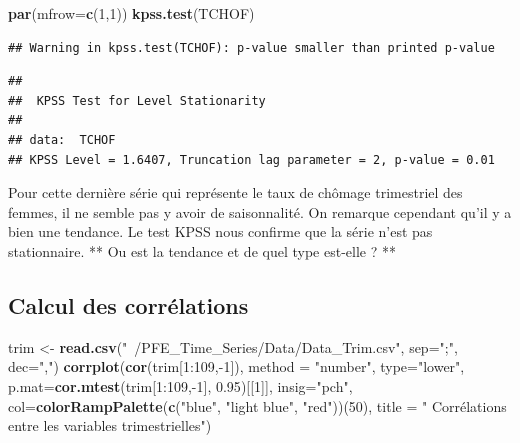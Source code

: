 \documentclass[11pt,]{article}
\newenvironment{Shaded}{\begin{snugshade}}{\end{snugshade}}
\newcommand{\KeywordTok}[1]{\textcolor[rgb]{0.13,0.29,0.53}{\textbf{{#1}}}}
\newcommand{\DataTypeTok}[1]{\textcolor[rgb]{0.13,0.29,0.53}{{#1}}}
\newcommand{\DecValTok}[1]{\textcolor[rgb]{0.00,0.00,0.81}{{#1}}}
\newcommand{\FloatTok}[1]{\textcolor[rgb]{0.00,0.00,0.81}{{#1}}}
\newcommand{\StringTok}[1]{\textcolor[rgb]{0.31,0.60,0.02}{{#1}}}
\newcommand{\NormalTok}[1]{{#1}}
\begin{document}
\begin{Shaded}
\begin{Highlighting}[]
  \KeywordTok{par}\NormalTok{(}\DataTypeTok{mfrow=}\KeywordTok{c}\NormalTok{(}\DecValTok{1}\NormalTok{,}\DecValTok{1}\NormalTok{))}
  \KeywordTok{kpss.test}\NormalTok{(TCHOF)}
\end{Highlighting}
\end{Shaded}

\begin{verbatim}
## Warning in kpss.test(TCHOF): p-value smaller than printed p-value
\end{verbatim}

\begin{verbatim}
## 
##  KPSS Test for Level Stationarity
## 
## data:  TCHOF
## KPSS Level = 1.6407, Truncation lag parameter = 2, p-value = 0.01
\end{verbatim}

Pour cette dernière série qui représente le taux de chômage trimestriel
des femmes, il ne semble pas y avoir de saisonnalité. On remarque
cependant qu'il y a bien une tendance. Le test KPSS nous confirme que la
série n'est pas stationnaire. ** Ou est la tendance et de quel type
est-elle ? **

\subsection{Calcul des corrélations}\label{calcul-des-correlations}

\begin{Shaded}
\begin{Highlighting}[]
\NormalTok{trim <-}\StringTok{ }\KeywordTok{read.csv}\NormalTok{(}\StringTok{"~/PFE_Time_Series/Data/Data_Trim.csv"}\NormalTok{, }\DataTypeTok{sep=}\StringTok{";"}\NormalTok{, }\DataTypeTok{dec=}\StringTok{","}\NormalTok{)}
\KeywordTok{corrplot}\NormalTok{(}\KeywordTok{cor}\NormalTok{(trim[}\DecValTok{1}\NormalTok{:}\DecValTok{109}\NormalTok{,-}\DecValTok{1}\NormalTok{]), }\DataTypeTok{method =} \StringTok{"number"}\NormalTok{, }\DataTypeTok{type=}\StringTok{"lower"}\NormalTok{,}
         \DataTypeTok{p.mat=}\KeywordTok{cor.mtest}\NormalTok{(trim[}\DecValTok{1}\NormalTok{:}\DecValTok{109}\NormalTok{,-}\DecValTok{1}\NormalTok{], }\FloatTok{0.95}\NormalTok{)[[}\DecValTok{1}\NormalTok{]], }\DataTypeTok{insig=}\StringTok{"pch"}\NormalTok{,}
         \DataTypeTok{col=}\KeywordTok{colorRampPalette}\NormalTok{(}\KeywordTok{c}\NormalTok{(}\StringTok{"blue"}\NormalTok{, }\StringTok{"light blue"}\NormalTok{, }\StringTok{"red"}\NormalTok{))(}\DecValTok{50}\NormalTok{), }\DataTypeTok{title =} \StringTok{"}
\StringTok{         Corrélations entre les variables trimestrielles"}\NormalTok{)}
\end{Highlighting}
\end{Shaded}
\end{document}
